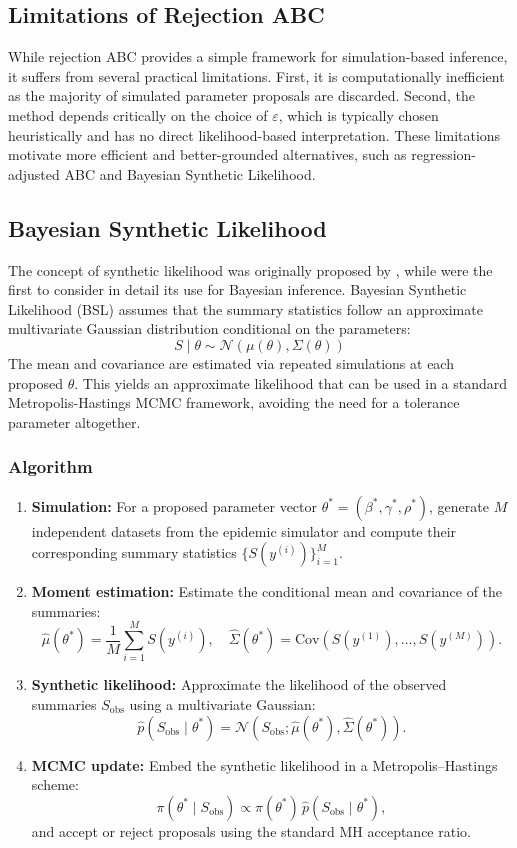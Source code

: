 \documentclass[12pt, a4paper]{article}
\begin{document}
\subsection{Limitations of Rejection ABC}
While rejection ABC provides a simple framework for simulation-based inference, it suffers from several practical limitations. First, it is computationally inefficient as the majority of simulated parameter proposals are discarded. Second, the method depends critically on the choice of $\varepsilon$, which is typically chosen heuristically and has no direct likelihood-based interpretation. These limitations motivate more efficient and better-grounded alternatives, such as regression-adjusted ABC and Bayesian Synthetic Likelihood.

\subsection{Bayesian Synthetic Likelihood}
The concept of synthetic likelihood was originally proposed by \citet{wood_statistical_2010}, while \citet{Price02012018} were the first to consider in detail its use for Bayesian inference. 
Bayesian Synthetic Likelihood (BSL) assumes that the summary statistics follow an approximate multivariate Gaussian distribution conditional on the parameters:
$$ S \mid \theta \sim \mathcal{N}(\mu(\theta), \Sigma(\theta))$$
The mean and covariance are estimated via repeated simulations at each proposed $\theta$. This yields an approximate likelihood that can be used in a standard Metropolis-Hastings MCMC framework, avoiding the need for a tolerance parameter altogether.

\subsubsection{Algorithm}
\begin{enumerate}
\item \textbf{Simulation:} For a proposed parameter vector $\theta^* = (\beta^*, \gamma^*, \rho^*)$, generate $M$ independent datasets from the epidemic simulator and compute their corresponding summary statistics $\{S(y^{(i)})\}_{i=1}^M$.

\item \textbf{Moment estimation:} Estimate the conditional mean and covariance of the summaries:
$$
\hat{\mu}(\theta^*) = \frac{1}{M} \sum_{i=1}^M S(y^{(i)}), 
\quad
\hat{\Sigma}(\theta^*) = \text{Cov}\left(S(y^{(1)}), \dots, S(y^{(M)})\right).
$$

\item \textbf{Synthetic likelihood:} Approximate the likelihood of the observed summaries $S_{\text{obs}}$ using a multivariate Gaussian:
$$
\hat{p}(S_{\text{obs}} \mid \theta^*) = \mathcal{N}(S_{\text{obs}}; \hat{\mu}(\theta^*), \hat{\Sigma}(\theta^*)).
$$

\item \textbf{MCMC update:} Embed the synthetic likelihood in a Metropolis--Hastings scheme:
$$
\pi(\theta^* \mid S_{\text{obs}}) \propto \pi(\theta^*) \, \hat{p}(S_{\text{obs}} \mid \theta^*),
$$
and accept or reject proposals using the standard MH acceptance ratio.
\end{enumerate}
\end{document}
